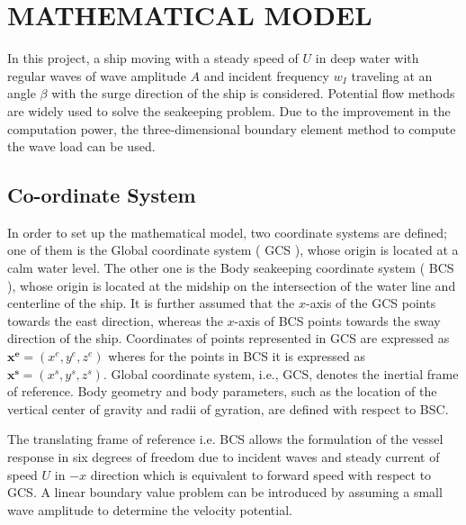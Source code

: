 \chapter{MATHEMATICAL MODEL}
In this project, a ship moving with a steady speed of $U$ in deep water with regular waves of wave amplitude $A$ and incident frequency $w_I$ traveling at an angle $\beta$ with the surge direction of the ship is considered. Potential flow methods are widely used to solve the seakeeping problem. Due to the improvement in the computation power, the three-dimensional boundary element method to compute the wave load can be used.

\section{Co-ordinate System}

In order to set up the mathematical model, two coordinate systems are defined; one of them is the Global coordinate system ( GCS ), whose origin is located at a calm water level. The other one is the Body seakeeping coordinate system ( BCS ), whose origin is located at the midship on the intersection of the water line and centerline of the ship. It is further assumed that the $x$-axis of the GCS points towards the east direction, whereas the $x$-axis of BCS points towards the sway direction of the ship. Coordinates of points represented in GCS are expressed as $\boldsymbol{x^e} = (x^e, y^e, z^e)$ wheres for the points in BCS it is expressed as $\boldsymbol{x^s} = (x^s, y^s, z^s)$. Global coordinate system, i.e., GCS, denotes the inertial frame of reference. Body geometry and body parameters, such as the location of the vertical center of gravity and radii of gyration, are defined with respect to BSC.

The translating frame of reference i.e. BCS allows the formulation of the vessel response in six degrees of freedom due to incident waves and steady current of speed $U$ in $-x$ direction which is equivalent to forward speed with respect to GCS. A linear boundary value problem can be introduced by assuming a small wave amplitude to determine the velocity potential.


